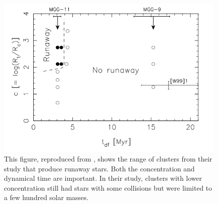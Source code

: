 \documentclass{princeton_astro_thesis}
\numberwithin{equation}{section}
\begin{document}
\begin{figure}
\centering
\includegraphics[width=\textwidth]{SPZRunaways}
\caption{This figure, reproduced from \citet{2004SPZ}, shows the range of clusters from their study that produce runaway stars.  Both the concentration and dynamical time are important.  In their study, clusters with lower concentration still had stars with some collisions but were limited to a few hundred solar masses.}
\label{fig:spzrunaway}
\end{figure}
\end{document}
